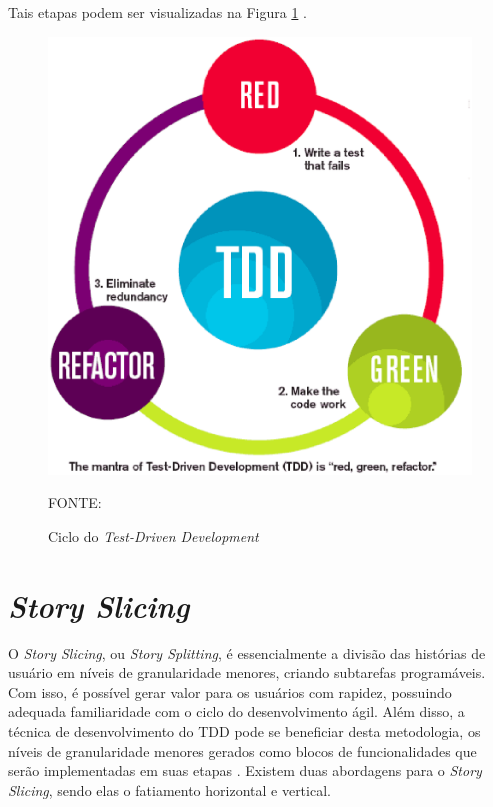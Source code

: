 Tais etapas podem ser visualizadas na Figura \ref{fig02} \cite{DevCommunity}.

\begin{figure}[h]
	\centering
	\caption{Ciclo do \textit{Test-Driven Development}}
	\includegraphics[keepaspectratio=true,scale=0.4]{figuras/fig02.eps}
	\parbox{\linewidth}{\centering FONTE: \cite{DevCommunity}}
	\label{fig02}
\end{figure}

\section{\textit{Story Slicing}}
\label{sectionStorySlicing}

O \textit{Story Slicing}, ou \textit{Story Splitting}, é essencialmente a divisão das histórias de 
usuário em níveis de granularidade menores, criando subtarefas programáveis. Com isso, é 
possível gerar valor para os usuários com rapidez, possuindo adequada familiaridade com o ciclo do 
desenvolvimento ágil. Além disso, a técnica de desenvolvimento do TDD pode se beneficiar desta metodologia, 
os níveis de granularidade menores gerados como blocos de funcionalidades que serão implementadas
em suas etapas \cite{beck2022test}. Existem duas abordagens para o \textit{Story Slicing}, sendo elas 
o fatiamento horizontal e vertical.

